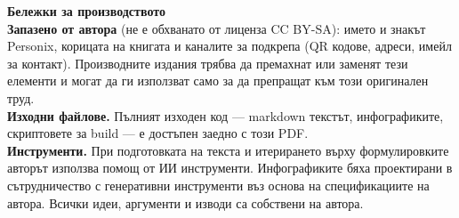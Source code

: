 \clearpage
\thispagestyle{empty}
\begin{flushleft}\small\sffamily
\textbf{Бележки за производството}\\[1.2em]

\textbf{Запазено от автора} (не е обхванато от лиценза CC BY-SA): името и
знакът Personix, корицата на книгата и каналите за подкрепа (QR кодове,
адреси, имейл за контакт). Производните издания трябва да премахнат или
заменят тези елементи и могат да ги използват само за да препращат към
този оригинален труд.\\[1.2em]

\textbf{Изходни файлове.} Пълният изходен код --- markdown текстът,
инфографиките, скриптовете за build --- е достъпен заедно с този PDF.\\[1.2em]

\textbf{Инструменти.} При подготовката на текста и итерирането върху
формулировките авторът използва помощ от ИИ инструменти. Инфографиките
бяха проектирани в сътрудничество с генеративни инструменти въз основа на
спецификациите на автора. Всички идеи, аргументи и изводи са собствени
на автора.
\end{flushleft}
\clearpage

